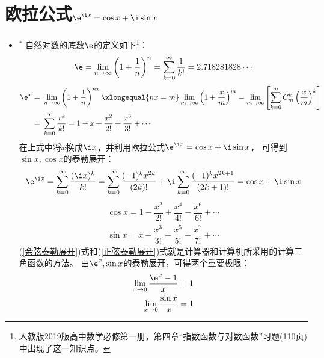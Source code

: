 

\section{欧拉公式$ \e^{\i x}=\cos x+\i\sin x $}
\begin{itemize}[leftmargin=\inteval{\myitemleftmargin}pt,itemsep=
   \inteval{\myitemitempsep}pt,topsep=\inteval{\myitemtopsep}pt]
\item $^*$ 自然对数的底数$ \e $的定义如下\footnote{人教版2019版高中数学必修第一册，第四章“指数函数与对数函数”习题(110页)中出现了这一知识点。}：
\begin{align}\label{e的定义}
\e=\lim_{n\to \infty}\left( 1+\dfrac{1}{n}\right)^n
=\sum_{k=0}^{\infty}\dfrac{1}{k!}= 2.718281828 \cdots
\end{align}
\begin{align}
\e^x=&\ \lim_{n\to\infty}\left(1+ \dfrac{1}{n}\right)^{nx}\xlongequal{nx=m}
\lim_{m\to\infty}\left(1+\dfrac{x}{m}\right)^{m}=\lim_{m\to\infty}
\left[\sum_{k=0}^{m}C_m^k\left(\dfrac{x}{m}\right)^k\right]\\
=&\ \sum_{k=0}^{\infty}\dfrac{x^k}{k!}=1+x+\dfrac{x^2}{2!}+\dfrac{x^3}{3!}+\cdots
\label{ex泰勒展开}
\end{align}
在上式中将$ x $换成$\i x$，并利用欧拉公式$ \e^{\i x}=\cos x+\i\sin x $，
可得到$ \sin x, \cos x $的泰勒展开：
\begin{gather*}
\e^{\i x} = \sum_{k=0}^{\infty}\dfrac{(\i x)^k}{k!}= \sum_{k=0}^{\infty}\dfrac{(-1)^k x^{2k}}{(2k)!}+
\i\sum_{k=0}^{\infty}\dfrac{(-1)^k x^{2k+1}}{(2k+1)!}=\cos x+\i\sin x 
\end{gather*}  
\begin{gather}  
\cos x=1-\dfrac{x^2}{2!}+\dfrac{x^4}{4!}-\dfrac{x^6}{6!}+\cdots 
\label{余弦泰勒展开} \\
\sin x=x-\dfrac{x^3}{3!}+\dfrac{x^5}{5!}-\dfrac{x^7}{7!}+\cdots 
\label{正弦泰勒展开}
\end{gather}
(\ref{余弦泰勒展开})式和(\ref{正弦泰勒展开})式就是计算器和计算机所采用的计算三角函数的方法。
由$ \e^x,\sin x $的泰勒展开，可得两个重要极限：
\begin{align}
\lim_{x\to 0}\dfrac{\e^x-1}{x}=1  \label{(e^x-1)/x极限} \\
\lim_{x\to 0}\dfrac{\sin x}{x}=1 \label{sinx/x极限}
\end{align}


\end{itemize}

